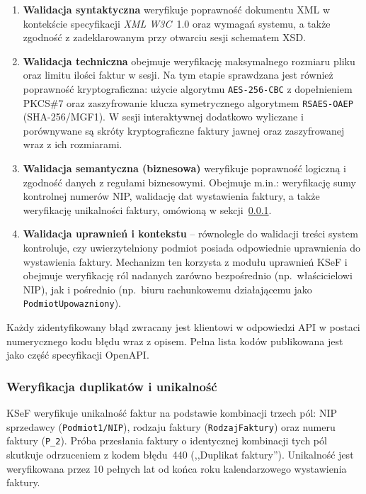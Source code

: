 \begin{enumerate}
    \item \textbf{Walidacja syntaktyczna} weryfikuje poprawność dokumentu XML w kontekście specyfikacji \textit{XML W3C}~1.0 oraz wymagań systemu, a także zgodność z zadeklarowanym przy otwarciu sesji schematem XSD.

    \item \textbf{Walidacja techniczna} obejmuje weryfikację maksymalnego rozmiaru pliku oraz limitu ilości faktur w sesji. Na tym etapie sprawdzana jest również poprawność kryptograficzna: użycie algorytmu \texttt{AES-256-CBC} z dopełnieniem PKCS\#7 oraz zaszyfrowanie klucza symetrycznego algorytmem \texttt{RSAES-OAEP} (SHA-256/MGF1). W sesji interaktywnej dodatkowo wyliczane i porównywane są skróty kryptograficzne faktury jawnej oraz zaszyfrowanej wraz z ich rozmiarami.

    \item \textbf{Walidacja semantyczna (biznesowa)} weryfikuje poprawność logiczną i zgodność danych z regułami biznesowymi. Obejmuje m.in.: weryfikację sumy kontrolnej numerów NIP, walidację dat wystawienia faktury, a także weryfikację unikalności faktury, omówioną w sekcji~\ref{sec:ksef-fa3-duplikaty}.

    \item \textbf{Walidacja uprawnień i kontekstu} -- równolegle do walidacji treści system kontroluje, czy uwierzytelniony podmiot posiada odpowiednie uprawnienia do wystawienia faktury. Mechanizm ten korzysta z modułu uprawnień KSeF i obejmuje weryfikację ról nadanych zarówno bezpośrednio (np.\ właścicielowi NIP), jak i pośrednio (np.\ biuru rachunkowemu działającemu jako \texttt{PodmiotUpowazniony}).
\end{enumerate}

Każdy zidentyfikowany błąd zwracany jest klientowi w odpowiedzi API w postaci numerycznego kodu błędu wraz z opisem. Pełna lista kodów publikowana jest jako część specyfikacji OpenAPI. \cite{ksef-openapi,ksef-weryfikacja-faktury}

\subsubsection{Weryfikacja duplikatów i unikalność}
\label{sec:ksef-fa3-duplikaty}

KSeF weryfikuje unikalność faktur na podstawie kombinacji trzech pól: NIP sprzedawcy (\texttt{Podmiot1/NIP}), rodzaju faktury (\texttt{RodzajFaktury}) oraz numeru faktury (\texttt{P\_2}). Próba przesłania faktury o identycznej kombinacji tych pól skutkuje odrzuceniem z kodem błędu~440 (,,Duplikat faktury''). Unikalność jest weryfikowana przez 10 pełnych lat od końca roku kalendarzowego wystawienia faktury. \cite{ksef-weryfikacja-faktury}




